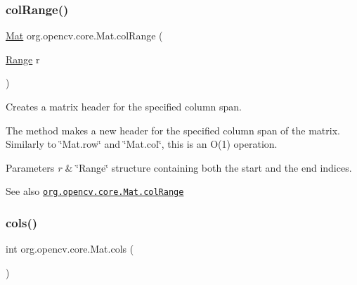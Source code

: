 \subsubsection{\texorpdfstring{col\+Range()}{colRange()}\hspace{0.1cm}{\footnotesize\ttfamily [2/2]}}
{\footnotesize\ttfamily \mbox{\hyperlink{classorg_1_1opencv_1_1core_1_1_mat}{Mat}} org.\+opencv.\+core.\+Mat.\+col\+Range (\begin{DoxyParamCaption}\item[{\mbox{\hyperlink{classorg_1_1opencv_1_1core_1_1_range}{Range}}}]{r }\end{DoxyParamCaption})}

Creates a matrix header for the specified column span.

The method makes a new header for the specified column span of the matrix. Similarly to \char`\"{}\+Mat.\+row\char`\"{} and \char`\"{}\+Mat.\+col\char`\"{}, this is an O(1) operation.


\begin{DoxyParams}{Parameters}
{\em r} & \char`\"{}\+Range\char`\"{} structure containing both the start and the end indices.\\
\hline
\end{DoxyParams}
\begin{DoxySeeAlso}{See also}
\href{http://docs.opencv.org/modules/core/doc/basic_structures.html#mat-colrange}{\tt org.\+opencv.\+core.\+Mat.\+col\+Range} 
\end{DoxySeeAlso}
\mbox{\label{classorg_1_1opencv_1_1core_1_1_mat_adddf469e35679e67bb350f779433ea8d}} 
\subsubsection{\texorpdfstring{cols()}{cols()}}
{\footnotesize\ttfamily int org.\+opencv.\+core.\+Mat.\+cols (\begin{DoxyParamCaption}{ }\end{DoxyParamCaption})}

\mbox{\label{classorg_1_1opencv_1_1core_1_1_mat_aa783d679e1b68aa5f9da6434be761eb7}} 
